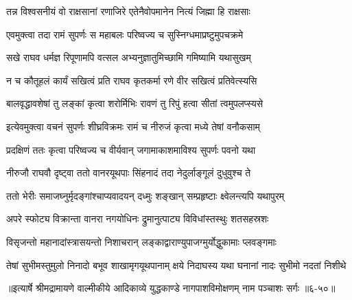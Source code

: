 \twolineshloka
{तन्न विश्वसनीयं वो राक्षसानां रणाजिरे}
{एतेनैवोपमानेन नित्यं जिह्मा हि राक्षसाः} %

\twolineshloka
{एवमुक्त्वा तदा रामं सुपर्णः स महाबलः}
{परिष्वज्य च सुस्निग्धमाप्रष्टुमुपचक्रमे} %

\twolineshloka
{सखे राघव धर्मज्ञ रिपूणामपि वत्सल}
{अभ्यनुज्ञातुमिच्छामि गमिष्यामि यथासुखम्} %

\twolineshloka
{न च कौतूहलं कार्यं सखित्वं प्रति राघव}
{कृतकर्मा रणे वीर सखित्वं प्रतिवेत्स्यसि} %

\twolineshloka
{बालवृद्धावशेषां तु लङ्कां कृत्वा शरोर्मिभिः}
{रावणं तु रिपुं हत्वा सीतां त्वमुपलप्स्यसे} %

\twolineshloka
{इत्येवमुक्त्वा वचनं सुपर्णः शीघ्रविक्रमः}
{रामं च नीरुजं कृत्वा मध्ये तेषां वनौकसाम्} %

\twolineshloka
{प्रदक्षिणं ततः कृत्वा परिष्वज्य च वीर्यवान्}
{जगामाकाशमाविश्य सुपर्णः पवनो यथा} %

\twolineshloka
{नीरुजौ राघवौ दृष्ट्वा ततो वानरयूथपाः}
{सिंहनादं तदा नेदुर्लाङ्गूलं दुधुवुश्च ते} %

\twolineshloka
{ततो भेरीः समाजघ्नुर्मृदङ्गांश्चाप्यवादयन्}
{दध्मुः शङ्खान् सम्प्रहृष्टाः क्ष्वेलन्त्यपि यथापुरम्} %

\twolineshloka
{अपरे स्फोट्य विक्रान्ता वानरा नगयोधिनः}
{द्रुमानुत्पाट्य विविधांस्तस्थुः शतसहस्रशः} %

\twolineshloka
{विसृजन्तो महानादांस्त्रासयन्तो निशाचरान्}
{लङ्काद्वाराण्युपाजग्मुर्योद्धुकामाः प्लवङ्गमाः} %

\twolineshloka
{तेषां सुभीमस्तुमुलो निनादो बभूव शाखामृगयूथपानाम्}
{क्षये निदाघस्य यथा घनानां नादः सुभीमो नदतां निशीथे} %


॥इत्यार्षे श्रीमद्रामायणे वाल्मीकीये आदिकाव्ये युद्धकाण्डे नागपाशविमोक्षणम् नाम पञ्चाशः सर्गः ॥६-५०॥
